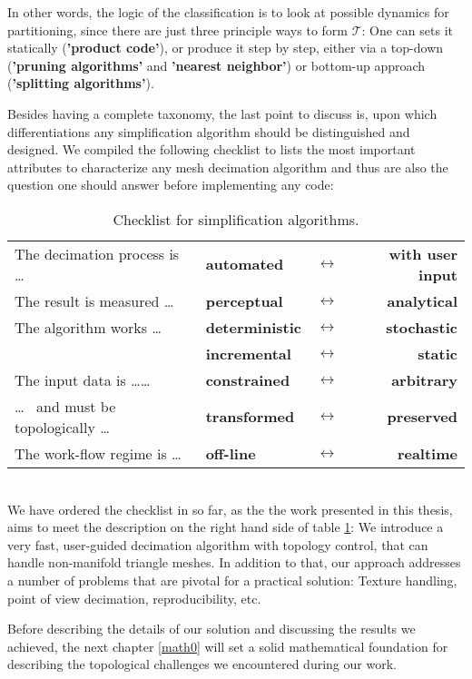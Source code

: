 In other words, the logic of the classification is to look at possible dynamics for partitioning, since there are just three principle ways to form $\mathcal{T}$: One can sets it statically (\textbf{'product code'}), or produce it step by step, either via a top-down (\textbf{'pruning algorithms'} and \textbf{'nearest neighbor'}) or bottom-up approach (\textbf{'splitting algorithms'}).

Besides having a complete taxonomy, the last point to discuss is, upon which differentiations any simplification algorithm should be distinguished and designed.
We compiled the following checklist to lists the most important attributes to characterize any mesh decimation algorithm and thus are also the question one should answer before implementing any code:
\begin{table}[htb]
\medskip
\setlength{\tabcolsep}{10pt}
\renewcommand{\arraystretch}{1.5}
   \centering
\begin{tabular}{ l l c r } \centering
	The decimation process is \dots & \textbf{automated} & $\longleftrightarrow$ & \textbf{with user input} \\
	The result is measured \dots & \textbf{perceptual} & $\longleftrightarrow$ & \textbf{analytical} \\
	The algorithm works \dots & \textbf{deterministic} & $\longleftrightarrow$ & \textbf{stochastic} \\
		 & \textbf{incremental} & $\longleftrightarrow$ & \textbf{static} \\
 	The input data is \dots \dots & \textbf{constrained} & $\longleftrightarrow$ & \textbf{arbitrary} \\
	\dots~ and must be topologically \dots & \textbf{transformed} & $\longleftrightarrow$ & \textbf{preserved} \\
	The work-flow regime is \dots & \textbf{off-line} & $\longleftrightarrow$ & \textbf{realtime} \\
\end{tabular}
   \label{tab:check_list} \bigskip
   \caption{Checklist for simplification algorithms.}
\end{table}\\
We have ordered the checklist in so far, as the the work presented in this thesis, aims to meet the description on the right hand side of table \ref{tab:check_list}: We introduce a very fast, user-guided decimation algorithm with topology control, that can handle non-manifold triangle meshes.
In addition to that, our approach addresses a number of problems that are pivotal for a practical solution: Texture handling, point of view decimation, reproducibility, etc. 

Before describing the details of our solution and discussing the results we achieved, the next chapter \ref{math0} will set a solid mathematical foundation for describing the topological challenges we encountered during our work.

